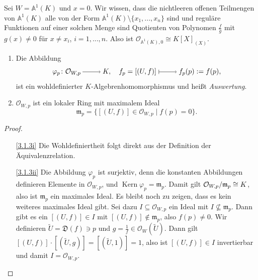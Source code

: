\documentclass[a4paper,12pt,index=toc]{scrbook}
\theoremstyle{keinenummern} %
\def\A{\mathbb{A}}
\def\O{\mathcal{O}}
\newcommand{\D}{\mathfrak{D}}
\def\m{\mathfrak{m}}
\newcommand{\Kern}{\operatorname{Kern}}
\renewcommand{\phi}{\varphi}
\renewcommand{\dotsc}{\ensuremath{\!...}}
\newcommand{\schlange}[1]{\widetilde{#1}}
\begin{document}
\begin{bsp}\label{3.1.2}
  Sei $W=\A^1(K)$ und $x=0$. Wir wissen, dass die nichtleeren offenen Teilmengen von $\A^1(K)$ alle von der Form
  $\A^1(K)\setminus\{x_1,\dotsc,x_n\}$ sind und reguläre Funktionen auf einer solchen Menge sind Quotienten von Polynomen
  $\frac{f}{g}$ mit $g(x)\neq0$ für $x\neq x_i$, $i=1,\dotsc,n$. Also ist $\O_{\A^1(K),0}\cong K[X]_{(X)}$.
\end{bsp}

\begin{bem}\label{3.1.3}
  \begin{enumerate}
  \item{} Die Abbildung \begin{equation*} \phi_{p}\colon \O_{W,p}\ra K,\quad f_p=[(U,f)]\mapsto f_p(p):=f(p), \end{equation*}
    ist ein wohldefinierter $K$-Algebrenhomomorphismus und heißt \emph{Auswertung}.
  \item{} $\O_{W,p}$ ist ein lokaler Ring mit maximalem Ideal \begin{equation*} \m_p = \{ [(U,f)]\in\O_{W,p}\mid f(p)=0\}. \end{equation*}
  \end{enumerate}
\end{bem}
\begin{proof}
  \begin{enumerate}
  \item[\ref{3.1.3i}] Die Wohldefiniertheit folgt direkt aus der Definition der Äquivalenzrelation.
  \item[\ref{3.1.3ii}] Die Abbildung $\phi_p$ ist surjektiv, denn die konstanten Abbildungen definieren Elemente in $\O_{W,p}$,
    und $\Kern \phi_p=\m_p$. Damit gilt $\Quotient{\O_{W,p}}{\m_p}\cong K$, also ist $\m_p$ ein maximales Ideal. Es bleibt noch zu
    zeigen, dass es kein weiteres maximales Ideal gibt. Sei dazu $I\subseteq\O_{W,p}$ ein Ideal mit $I\not\subseteq \m_p$. Dann
    gibt es ein $[(U,f)]\in I$ mit $[(U,f)]\notin \m_p$, also $f(p)\neq0$. Wir definieren $\schlange{U}=\D(f)\ni p$ und
    $g=\frac1f\in\O_W(\schlange{U})$. Dann gilt $[(U,f)]\cdot[(\schlange{U},g)]=[(\schlange{U},1)]=1$, also ist $[(U,f)]\in I$
    invertierbar und damit $I=\O_{W,p}$.
  \end{enumerate}
\end{proof}
\end{document}
